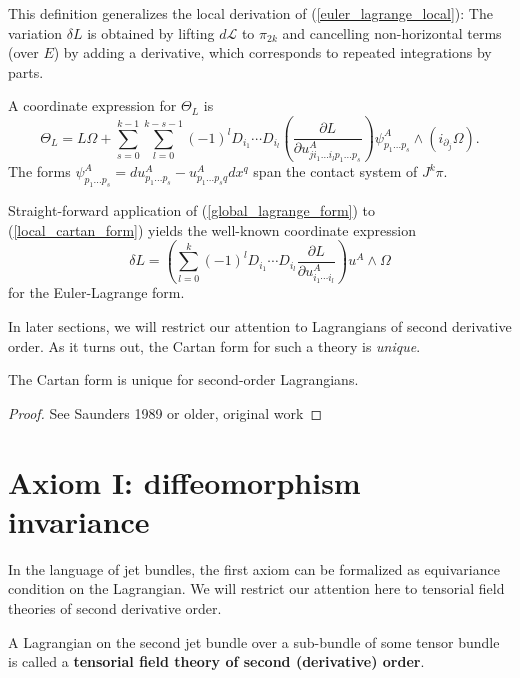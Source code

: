 This definition generalizes the local derivation of (\ref{euler_lagrange_local}): The variation $\delta L$ is obtained by lifting $d\mathcal L$ to $\pi_{2k}$ and cancelling non-horizontal terms (over $E$) by adding a derivative, which corresponds to repeated integrations by parts.

A coordinate expression for $\Theta_L$ is
\begin{equation}\label{local_cartan_form}
  \Theta_L = L\Omega + \sum_{s=0}^{k-1} \sum_{l=0}^{k-s-1} (-1)^l D_{i_1} \cdots D_{i_l} \left(\frac{\partial L}{\partial u^A_{j i_1 \dots i_{l} p_1 \dots p_s}}\right) \psi^A_{p_1\dots p_s} \wedge \left(i_{\partial_j}\Omega\right).
\end{equation}
The forms $\psi^A_{p_1\dots p_s} = du^A_{p_1\dots p_s} - u^A_{p_1\dots p_sq} dx^q$ span the contact system of $J^k\pi$.

Straight-forward application of (\ref{global_lagrange_form}) to (\ref{local_cartan_form}) yields the well-known coordinate expression
\begin{equation}
  \delta L = \left( \sum_{l=0}^{k} (-1)^l D_{i_1} \cdots D_{i_l} \frac{\partial L}{\partial u^A_{i_1\cdots i_l}}\right) u^A \wedge \Omega
\end{equation}
for the Euler-Lagrange form.

In later sections, we will restrict our attention to Lagrangians of second derivative order. As it turns out, the Cartan form for such a theory is \emph{unique}.
\begin{proposition}
  The Cartan form is unique for second-order Lagrangians.
\end{proposition}
\begin{proof}
  See Saunders 1989 or older, original work
\end{proof}

\section{Axiom I: diffeomorphism invariance}

In the language of jet bundles, the first axiom can be formalized as equivariance condition on the Lagrangian. We will restrict our attention here to tensorial field theories of second derivative order.

\begin{definition}
  A Lagrangian on the second jet bundle over a sub-bundle of some tensor bundle is called a \textbf{tensorial field theory of second (derivative) order}.
\end{definition}

